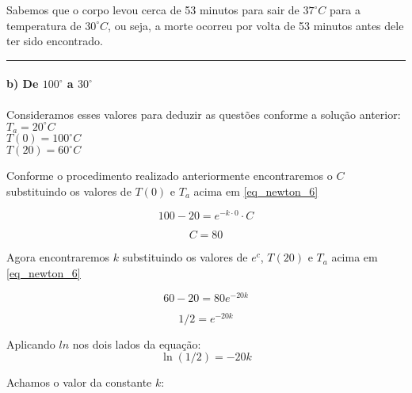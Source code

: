 \documentclass[11pt]{article}
\begin{document}
Sabemos que o corpo levou cerca de 53 minutos para sair de
\(37^{\circ}C\) para a temperatura de \(30^{\circ}C\), ou seja, a morte
ocorreu por volta de 53 minutos antes dele ter sido encontrado.

    \begin{center}\rule{0.5\linewidth}{\linethickness}\end{center}

\hypertarget{b-de-100circ-a-30circ}{%
\paragraph{\texorpdfstring{b) De \(100^{\circ}\) a
\(30^{\circ}\)}{b) De 100\^{}\{\textbackslash{}circ\} a 30\^{}\{\textbackslash{}circ\}}}\label{b-de-100circ-a-30circ}}

Consideramos esses valores para deduzir as questões conforme a solução
anterior:\\
\(T_{a} = 20^{\circ}C\)\\
\(T(0) = 100^{\circ}C\)\\
\(T(20) = 60^{\circ}C\)

Conforme o procedimento realizado anteriormente encontraremos o \(C\)
substituindo os valores de \(T(0)\) e \(T_{a}\) acima em
\eqref{eq_newton_6}

\begin{equation*}
    \label{eq_newton_subst_ec*}
    100 - 20 = e^{-k \cdot 0} \cdot C
\end{equation*}

\begin{equation}
    \label{eq_newton_achou_ec_b}
    C = 80
\end{equation}

Agora encontraremos \(k\) substituindo os valores de \(e^{c}\),
\(T(20)\) e \(T_{a}\) acima em \eqref{eq_newton_6}

\begin{equation*}
    \label{eq_newton_subst_k}
    60 - 20 = 80e^{-20k}
\end{equation*}

\begin{equation*}
    \label{eq_newton_subst_k1}
    1/2 = e^{-20k}
\end{equation*}

Aplicando \(ln\) nos dois lados da equação: \begin{equation*}
    \label{eq_newton_subst_k2}
    \ln(1/2) = -20k
\end{equation*}

Achamos o valor da constante \(k\):
\end{document}
